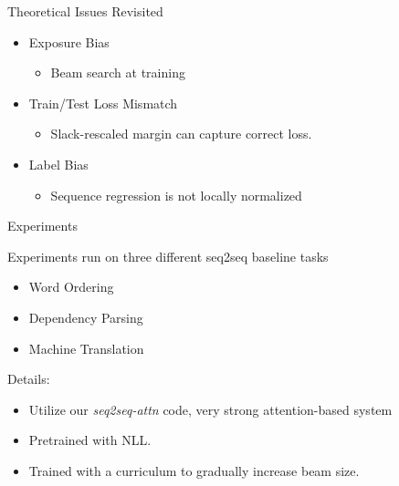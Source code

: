 

\begin{frame}{Theoretical Issues Revisited}
  \begin{itemize}

  \item Exposure Bias
    \begin{itemize}
    \item Beam search at training
    \end{itemize}
    \air
  \item Train/Test Loss Mismatch 
    \begin{itemize}
    \item Slack-rescaled margin can capture correct loss.
    \end{itemize}

    \air
  \item Label Bias  \cite{Lafferty2001}
    \begin{itemize}
    \item Sequence regression is not locally normalized
    \end{itemize}

  \end{itemize}
\end{frame}


\begin{frame}{Experiments}
  \air 

  Experiments run on three different seq2seq baseline tasks

  \begin{itemize}
  \item Word Ordering
    \air
  \item Dependency Parsing
    \air 
  \item Machine Translation
  \end{itemize}



  Details:
  \begin{itemize}
  \item Utilize our \textit{seq2seq-attn} code, very strong attention-based system 
  \item Pretrained with NLL. 
  \item Trained with a curriculum to gradually increase beam size.
  \end{itemize}
 
\end{frame}


